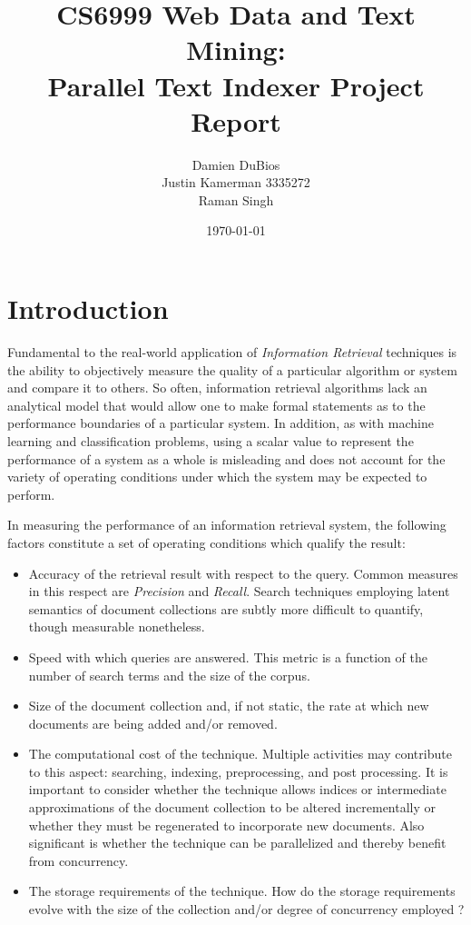 \documentclass[10pt]{report}
\title{CS6999 Web Data and Text Mining:\\Parallel Text Indexer Project Report}
\author{Damien DuBios\\Justin Kamerman 3335272\\Raman Singh}
\date{\today}
\begin{document}
\maketitle
\renewcommand*\thesection{\arabic{section}}

\section{Introduction}
Fundamental to the real-world application of \textit{Information
  Retrieval} techniques is the ability to objectively measure the
quality of a particular algorithm or system and compare it to
others. So often, information retrieval algorithms lack an analytical
model that would allow one to make formal statements as to the
performance boundaries of a particular system. In addition, as with
machine learning and classification problems, using a scalar value to
represent the performance of a system as a whole is misleading and
does not account for the variety of operating conditions under which
the system may be expected to perform. 

In measuring the performance of an information retrieval system, the
following factors constitute a set of operating conditions which
qualify the result:

\begin{itemize}
  \item Accuracy of the retrieval result with respect to the
    query. Common measures in this respect are \textit{Precision} and
    \textit{Recall}. Search techniques employing latent semantics of
    document collections are subtly more difficult to quantify, though
    measurable nonetheless.

    \item Speed with which queries are answered. This metric is a
      function of the number of search terms and the size of the
      corpus.

    \item Size of the document collection and, if not static, the rate
      at which new documents are being added and/or removed.
    

    \item The computational cost of the technique. Multiple
      activities may contribute to this aspect: searching, indexing,
      preprocessing, and post processing. It is important to consider
      whether the technique allows indices or intermediate
      approximations of the document collection to be altered
      incrementally or whether they must be regenerated to incorporate
      new documents. Also significant is whether the technique can be
      parallelized and thereby benefit from concurrency.

    \item The storage requirements of the technique. How do the
      storage requirements evolve with the size of the collection
      and/or degree of concurrency employed ?
\end{itemize}
\end{document}
